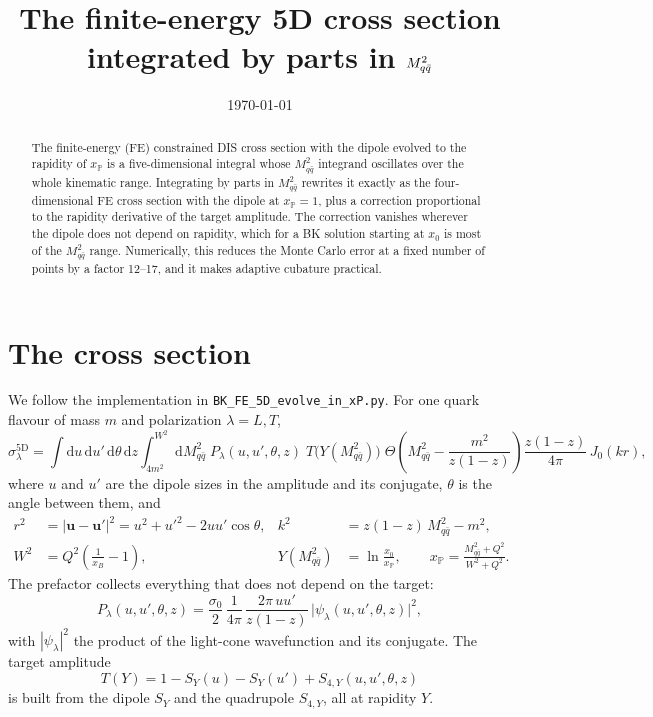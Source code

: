 \documentclass[11pt,a4paper]{article}
\title{The finite-energy 5D cross section\\integrated by parts in $\Mqq$}
\author{}
\date{\today}
\newcommand{\Mqq}{M_{q\bar q}^2}
\newcommand{\dd}{\mathrm{d}}
\newcommand{\xP}{x_{\mathbb{P}}}
\begin{document}
\maketitle

\begin{abstract}
  The finite-energy (FE) constrained DIS cross section with the dipole evolved
  to the rapidity of $\xP$ is a five-dimensional integral whose $\Mqq$ integrand
  oscillates over the whole kinematic range. Integrating by parts in $\Mqq$
  rewrites it exactly as the four-dimensional FE cross section with the dipole
  at $\xP = 1$, plus a correction proportional to the rapidity derivative of
  the target amplitude. The correction vanishes wherever the dipole does not
  depend on rapidity, which for a BK solution starting at $x_0$ is most of the
  $\Mqq$ range. Numerically, this reduces the Monte Carlo error at a fixed
  number of points by a factor 12--17, and it makes adaptive cubature
  practical.
\end{abstract}

\section{The cross section}

We follow the implementation in
\texttt{BK\_FE\_5D\_evolve\_in\_xP.py}. For one quark flavour of mass $m$ and
polarization $\lambda = L, T$,
\begin{equation}
  \sigma_\lambda^{\text{5D}}
  = \int \dd u \, \dd u' \, \dd\theta \, \dd z
    \int_{4m^2}^{W^2} \dd\Mqq \;
    P_\lambda(u, u', \theta, z) \;
    T\big(Y(\Mqq)\big) \;
    \Theta\!\left(\Mqq - \frac{m^2}{z(1-z)}\right)
    \frac{z(1-z)}{4\pi} \, J_0(k r) ,
  \label{eq:sigma5d}
\end{equation}
where $u$ and $u'$ are the dipole sizes in the amplitude and its conjugate,
$\theta$ is the angle between them, and
\begin{align}
  r^2 &= |\mathbf{u} - \mathbf{u}'|^2 = u^2 + u'^2 - 2 u u' \cos\theta , &
  k^2 &= z(1-z) \, \Mqq - m^2 , \\
  W^2 &= Q^2 \left(\frac{1}{x_B} - 1\right) , &
  Y(\Mqq) &= \ln \frac{x_0}{\xP} , \qquad
  \xP = \frac{\Mqq + Q^2}{W^2 + Q^2} .
\end{align}
The prefactor collects everything that does not depend on the target:
\begin{equation}
  P_\lambda(u, u', \theta, z)
  = \frac{\sigma_0}{2} \, \frac{1}{4\pi} \,
    \frac{2\pi \, u u'}{z(1-z)} \,
    \big|\psi_\lambda(u, u', \theta, z)\big|^2 ,
\end{equation}
with $|\psi_\lambda|^2$ the product of the light-cone wavefunction and its
conjugate. The target amplitude
\begin{equation}
  T(Y) = 1 - S_Y(u) - S_Y(u') + S_{4,Y}(u, u', \theta, z)
\end{equation}
is built from the dipole $S_Y$ and the quadrupole $S_{4,Y}$, all at rapidity
$Y$.
\end{document}
